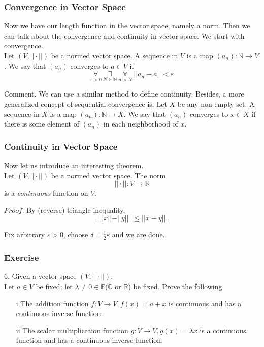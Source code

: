 \documentclass{beamer}
\begin{document}
\begin{frame}
    \frametitle{Convergence in Vector Space}
Now we have our length function in the vector space, namely a norm. Then we can talk about the convergence and continuity in vector space. We start with convergence.\\
\vspace{1em}
\hspace{1em}
Let $(V,||\cdot||)$ be a normed vector space. A sequence in $V$ is a map $(a_n):\mathbb{N}\rightarrow V$. We say that $(a_n)$ converges to $a\in V$ if 
\begin{equation*}
    \underset{\varepsilon>0}{\forall}\ \underset{N\in\mathbb{N}}{\exists}\ \underset{n>N}{\forall}\ ||a_n-a||<\varepsilon
\end{equation*}

\vspace{1em}
Comment. We can use a similar method to define continuity. Besides, a more generalized concept of sequential convergence is: Let $X$ be any non-empty set. 
A sequence in $X$ is a map $(a_n):\mathbb{N}\rightarrow X$. We say that $(a_n)$  converges to $x\in X$ if there is some element of $(a_n)$ in each neighborhood of $x$.

\end{frame}

\begin{frame}
    \frametitle{Continuity in Vector Space}
Now let us introduce an interesting theorem. \\
\vspace{1em}
\hspace{1em}
Let $(V,||\cdot||)$ be a normed vector space. The norm 
\begin{equation*}
    ||\cdot||:V\rightarrow \mathbb{R}
\end{equation*}
is a \emph{continuous} function on $V$.

\vspace{1em}
$Proof.$ \hspace{1em} 
By (reverse) triangle inequality, 
\begin{equation*}
    |\ ||x||-||y||\ |\leq ||x-y||.
\end{equation*}

Fix arbitrary $\varepsilon>0$, choose $\delta=\frac{1}{2}\varepsilon$ and we are done.
\end{frame}
\begin{frame}
    \frametitle{Exercise}
6. Given a vector space $(V,||\cdot||)$.\\
Let $a\in V$ be fixed; let $\lambda\neq 0\in \mathbb{F}$($\mathbb{C}$ or $\mathbb{R}$) be fixed. Prove the following. 
\begin{enumerate}
    \item[i]    The addition function $f:V\rightarrow V,f(x)=a+x$ is continuous and has a continuous inverse function.
    \item[ii]  The scalar multiplication function $g:V\rightarrow V, g(x)=\lambda x$ is a continuous function and has a continuous inverse function.
\end{enumerate}
\end{frame}
\end{document}
